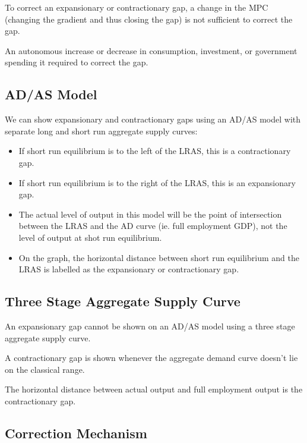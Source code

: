 \documentclass[a4paper,11pt]{report}
\begin{document}
To correct an expansionary or contractionary gap, a change in the MPC (changing
the gradient and thus closing the gap) is not sufficient to correct the gap.

An autonomous increase or decrease in consumption, investment, or government
spending it required to correct the gap.

\subsection{AD/AS Model}


We can show expansionary and contractionary gaps using an AD/AS model with
separate long and short run aggregate supply curves:

\begin{itemize}
\item If short run equilibrium is to the left of the LRAS, this is a
	contractionary gap.
\item If short run equilibrium is to the right of the LRAS, this is an
	expansionary gap.
\item The actual level of output in this model will be the point of intersection
	between the LRAS and the AD curve (ie. full employment GDP), not the level
	of output at shot run equilibrium.
\item On the graph, the horizontal distance between short run equilibrium and
	the LRAS is labelled as the expansionary or contractionary gap.
\end{itemize}

\subsection{Three Stage Aggregate Supply Curve}


An expansionary gap cannot be shown on an AD/AS model using a three stage
aggregate supply curve.

A contractionary gap is shown whenever the aggregate demand curve doesn't lie on
the classical range.

The horizontal distance between actual output and full employment output is the
contractionary gap.

\subsection{Correction Mechanism}
\end{document}

